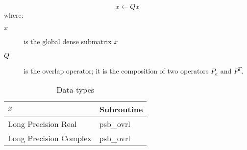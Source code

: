 \[ x \leftarrow Q x \]
where:
\begin{description}
\item[$x$] is the global dense submatrix $x$
\item[$Q$] is the overlap operator; it is the composition of two
operators $ P_a$ and $ P^{T}$. 
\end{description}

\begin{table}[h]
\begin{center}
\begin{tabular}{ll}
\hline
$x$ & {\bf Subroutine}\\
\hline
Long Precision Real & psb\_ovrl \\
Long Precision Complex & psb\_ovrl \\
\hline
\end{tabular}
\end{center}
\caption{Data types\label{tab:f90ovrl}}
\end{table}


